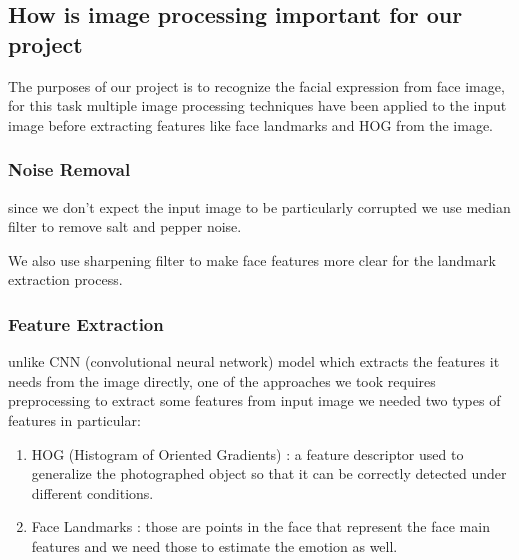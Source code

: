 \subsection{How is image processing important for our project}
The purposes of our project is to recognize the facial expression from face image, for this task multiple image 
processing techniques have been applied to the input image before extracting features like face landmarks and HOG from the image.

\subsubsection{Noise Removal}
since we don't expect the input image to be particularly corrupted we  use median filter to 
remove salt and pepper noise.

We also use sharpening filter to make face features more clear for the landmark extraction process.

\subsubsection{Feature Extraction}
unlike CNN (convolutional neural network) model which extracts the features it needs from the image directly, 
one of the approaches we took requires preprocessing to extract some features from input image
we needed two types of features in particular:
\begin{enumerate}
	\item HOG (Histogram of Oriented Gradients) : a feature descriptor used to generalize the photographed object so that it can be correctly detected under different conditions.
	\item Face Landmarks : those are points in the face that represent the face main features and we need those to estimate the emotion as well.
\end{enumerate}
